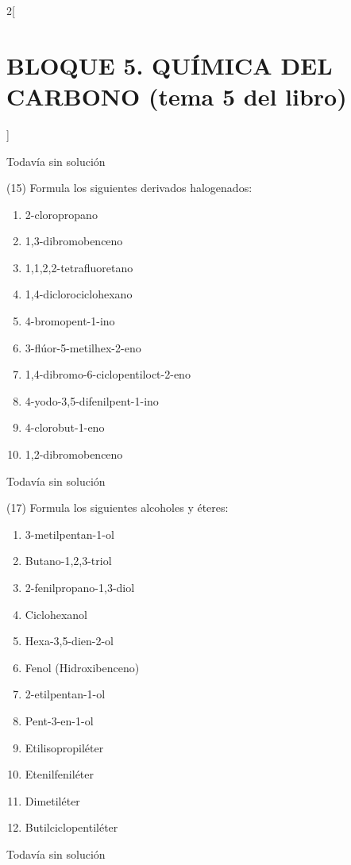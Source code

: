 \documentclass[10pt]{article}
\begin{document}
\begin{multicols}{2}[
  \section{BLOQUE 5. QUÍMICA DEL CARBONO (tema 5 del libro)}
  ]
\begin{solution}[print=false]
  Todavía sin solución
\end{solution}

\begin{exercise}
  (15) Formula los siguientes derivados halogenados:
  \begin{enumerate}
    \item 2-cloropropano
    \item 1,3-dibromobenceno
    \item 1,1,2,2-tetrafluoretano
    \item 1,4-diclorociclohexano
    \item 4-bromopent-1-ino
    \item 3-flúor-5-metilhex-2-eno
    \item 1,4-dibromo-6-ciclopentiloct-2-eno
    \item 4-yodo-3,5-difenilpent-1-ino
    \item 4-clorobut-1-eno
    \item 1,2-dibromobenceno
  \end{enumerate}
\end{exercise}

\begin{solution}[print=false]
  Todavía sin solución
\end{solution}

\begin{exercise}
  (17) Formula los siguientes alcoholes y éteres:
  \begin{enumerate}
    \item 3-metilpentan-1-ol
    \item Butano-1,2,3-triol
    \item 2-fenilpropano-1,3-diol
    \item Ciclohexanol
    \item Hexa-3,5-dien-2-ol
    \item Fenol (Hidroxibenceno)
    \item 2-etilpentan-1-ol
    \item Pent-3-en-1-ol
    \item Etilisopropiléter
    \item Etenilfeniléter
    \item Dimetiléter
    \item Butilciclopentiléter
  \end{enumerate}
\end{exercise}

\begin{solution}[print=false]
  Todavía sin solución
\end{solution}


\end{multicols}
\end{document}
